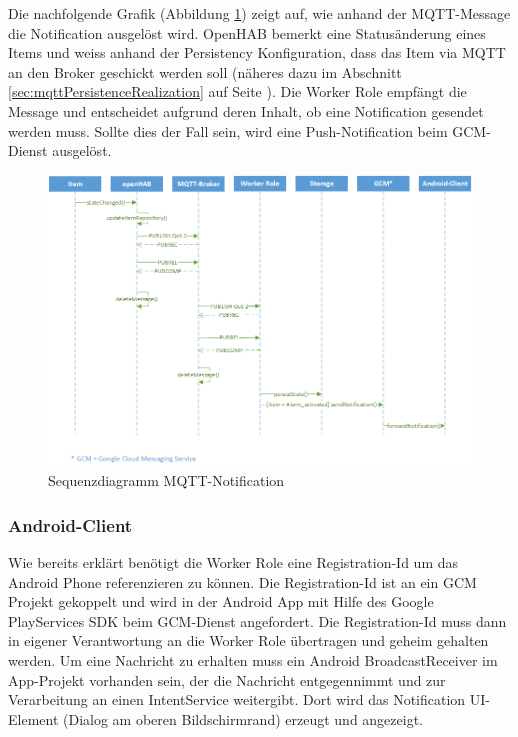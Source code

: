 Die nachfolgende Grafik (Abbildung \ref{fig:sequenzNotification}) zeigt auf, wie anhand der MQTT-Message die Notification ausgelöst wird. OpenHAB bemerkt eine Statusänderung eines Items und weiss anhand der Persistency Konfiguration, dass das Item via MQTT an den Broker geschickt werden soll (näheres dazu im Abschnitt \ref{sec:mqttPersistenceRealization} auf Seite \pageref{sec:mqttPersistenceRealization}). Die Worker Role empfängt die Message und entscheidet aufgrund deren Inhalt, ob eine Notification gesendet werden muss. Sollte dies der Fall sein, wird eine Push-Notification beim GCM-Dienst ausgelöst.

\begin{figure}[H]
	\centering
		\includegraphics[scale=0.65]{report/img/sequenzDiagramNotification}
	\caption{Sequenzdiagramm MQTT-Notification}
	\label{fig:sequenzNotification}
\end{figure}

\subsubsection{Android-Client}
Wie bereits erklärt benötigt die Worker Role eine Registration-Id um das Android Phone referenzieren zu können. Die Registration-Id ist an ein GCM Projekt gekoppelt und wird in der Android App mit Hilfe des Google PlayServices SDK beim GCM-Dienst angefordert. Die Registration-Id muss dann in eigener Verantwortung an die Worker Role übertragen und geheim gehalten werden. Um eine Nachricht zu erhalten muss ein Android BroadcastReceiver im App-Projekt vorhanden sein, der die Nachricht entgegennimmt und zur Verarbeitung an einen IntentService weitergibt. Dort wird das Notification UI-Element (Dialog am oberen Bildschirmrand) erzeugt und angezeigt.

